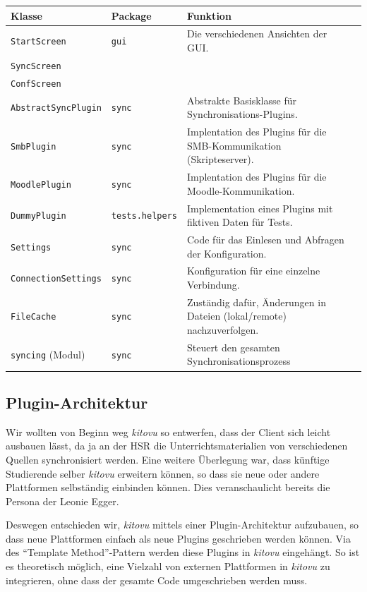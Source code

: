 \documentclass[a4paper]{article}
\begin{document}
\begin{tabulary}{\linewidth}{llLl}
	\toprule
	Klasse & Package & Funktion \\
	\midrule
  \verb|StartScreen| & \verb|gui| & Die verschiedenen Ansichten der GUI. \\
  \verb|SyncScreen| & & \\
  \verb|ConfScreen| & & \\
  \hline
  \verb|AbstractSyncPlugin| & \verb|sync| & Abstrakte Basisklasse für Synchronisations-Plugins. \\
  \verb|SmbPlugin| & \verb|sync| & Implentation des Plugins für die SMB-Kommunikation (Skripteserver). \\
  \verb|MoodlePlugin| & \verb|sync| & Implentation des Plugins für die Moodle-Kommunikation. \\
  \verb|DummyPlugin| & \verb|tests.helpers| & Implementation eines Plugins mit fiktiven Daten für Tests. \\
  \hline
  \verb|Settings| & \verb|sync| & Code für das Einlesen und Abfragen der Konfiguration. \\
  \verb|ConnectionSettings| & \verb|sync| & Konfiguration für eine einzelne Verbindung. \\
  \hline
  \verb|FileCache| & \verb|sync| & Zuständig dafür, Änderungen in Dateien (lokal/remote) nachzuverfolgen. \\
  \verb|syncing| (Modul) & \verb|sync| & Steuert den gesamten Synchronisationsprozess \\
	\bottomrule
\end{tabulary}

\pagebreak

\subsection{Plugin-Architektur}

Wir wollten von Beginn weg \emph{kitovu} so entwerfen, dass der Client sich leicht ausbauen lässt, da ja an der HSR die Unterrichtsmaterialien von verschiedenen Quellen synchronisiert werden. Eine weitere Überlegung war, dass künftige Studierende selber \emph{kitovu} erweitern können, so dass sie neue oder andere Plattformen selbständig einbinden können. Dies veranschaulicht bereits die Persona der Leonie Egger. 

Deswegen entschieden wir, \emph{kitovu} mittels einer Plugin-Architektur aufzubauen, so dass neue Plattformen einfach als neue Plugins geschrieben werden können. Via des ``Template Method''-Pattern werden diese Plugins in \emph{kitovu} eingehängt. So ist es theoretisch möglich, eine Vielzahl von externen Plattformen in \emph{kitovu} zu integrieren, ohne dass der gesamte Code umgeschrieben werden muss.
\end{document}
